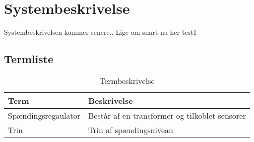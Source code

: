 
\section{Systembeskrivelse}

Systembeskrivelsen kommer senere.. Lige om snart nu her test1 

\subsection{Termliste}

\begin{table}[htbp]
\centering
\begin{tabular}{|l|l|}
\hline
\textbf{Term} 	& \textbf{Beskrivelse} \\\hline
Spændingsregaulator	& Består af en transformer og tilkoblet sensorer \\\hline
Trin 	& Trin af spændingsniveau \\\hline

\end{tabular}
\caption{Termbeskrivelse}
\label{tab:termbeskrivelsen}

\end{table}